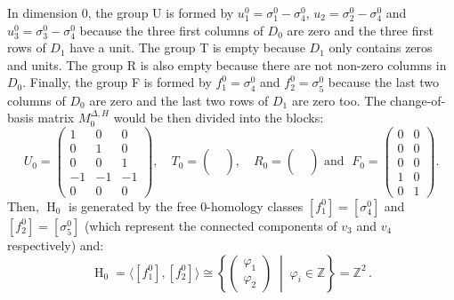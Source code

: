 \documentclass[a4paper,10pt]{article}
\newcommand{\bbz}{\mathbb{Z}}
\DeclareMathOperator{\Ho}{H}
\begin{document}
In dimension 0, the group U is formed by \(u^0_1=\sigma^0_1-\sigma^0_{4}\), \(u_{2}=\sigma^0_{2}-\sigma^0_{4}\) and \(u^0_{3}=\sigma^0_{3}-\sigma^0_{4}\) because the three first columns of \(D_0\) are zero and the three first rows of \(D_1\) have a unit. The group T is empty because \(D_1\) only contains zeros and units. The group R is also empty because there are not non-zero columns in \(D_0\). Finally, the group F is formed by \(f^0_1=\sigma^0_4\) and \(f^0_2=\sigma^{0}_{5}\) because the last two columns of \(D_0\) are zero and the last two rows of \(D_1\) are zero too. The change-of-basis matrix \(M^{\Delta, H}_0\) would be then divided into the blocks:
\[
U_0=
\left(
\begin{array}{rrr}
 1 &  0 &  0 \\
 0 &  1 &  0 \\
 0 &  0 &  1 \\
-1 & -1 & -1 \\
 0 &  0 &  0
\end{array}
\right),
\quad T_0=
\left(\begin{array}{r}\;\\\;\\\;\\\;\\\;\end{array}\right),
\quad R_0=
\left(\begin{array}{r}\;\\\;\\\;\\\;\\\;\end{array}\right)
\text{  and  } 
\;F_0=
\left(
\begin{array}{rr}
 0 &  0 \\
 0 &  0 \\
 0 &  0 \\
 1 &  0 \\
 0 &  1
\end{array}
\right).
\]
Then, \(\Ho_0\) is generated by the free \(0\)-homology classes \([f^0_1]=[\sigma^0_4]\) and \([f^0_{2}]=[\sigma^0_{5}]\) (which represent the connected components of \(v_3\) and \(v_4\) respectively) and: 
\[
\Ho_0 = \langle [f^0_1], [f^0_2] \rangle \cong \left\{
\left(\begin{array}{c}\varphi_1 \\ \varphi_2 \end{array}\right)
\; \middle | \; \varphi_i \in \bbz
\right\} = \bbz^2\,.
\]
\end{document}
